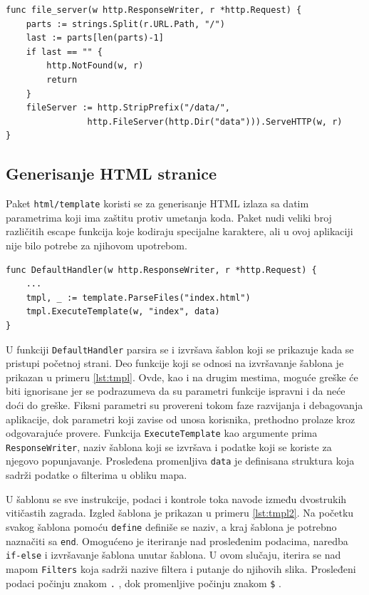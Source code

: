 \documentclass[12pt,oneside]{memoir}
\begin{document}
\begin{center}
\begin{lstlisting}[caption=Funkcija za rukovanje sa sistemom datoteka,label={lst:fileserver},  backgroundcolor=\color{background}]
func file_server(w http.ResponseWriter, r *http.Request) {
	parts := strings.Split(r.URL.Path, "/")
	last := parts[len(parts)-1]
	if last == "" {
		http.NotFound(w, r)
		return
	}
	fileServer := http.StripPrefix("/data/", 
				http.FileServer(http.Dir("data"))).ServeHTTP(w, r)
}
\end{lstlisting}
\end{center}

\subsection{Generisanje HTML stranice}

Paket \texttt{html/template} koristi se za generisanje HTML izlaza sa datim parametrima koji ima zaštitu protiv umetanja koda. Paket nudi veliki broj različitih escape funkcija koje kodiraju specijalne karaktere, ali u ovoj aplikaciji nije bilo potrebe za njihovom upotrebom. 

\begin{center}
\begin{lstlisting}[caption=Izvršavanje HTML šablona,label={lst:tmpl},  backgroundcolor=\color{background}]
func DefaultHandler(w http.ResponseWriter, r *http.Request) {
	...
	tmpl, _ := template.ParseFiles("index.html")
	tmpl.ExecuteTemplate(w, "index", data)
}
\end{lstlisting}
\end{center}

U funkciji \texttt{DefaultHandler} parsira se i izvršava šablon koji se prikazuje kada se pristupi početnoj strani. Deo funkcije koji se odnosi na izvršavanje šablona je prikazan u primeru \ref{lst:tmpl}. Ovde, kao i na drugim mestima, moguće greške će biti ignorisane jer se podrazumeva da su parametri funkcije ispravni i da neće doći do greške. Fiksni parametri su provereni tokom faze razvijanja i debagovanja aplikacije, dok parametri koji zavise od unosa korisnika, prethodno prolaze kroz odgovarajuće provere. Funkcija \texttt{ExecuteTemplate} kao argumente prima \texttt{ResponseWriter}, naziv šablona koji se izvršava i podatke koji se koriste za njegovo popunjavanje. Prosleđena promenljiva \texttt{data} je definisana struktura koja sadrži podatke o filterima u obliku mapa.

U šablonu se sve instrukcije, podaci i kontrole toka navode između dvostrukih vitičastih zagrada. Izgled šablona je prikazan u primeru \ref{lst:tmpl2}. Na početku svakog šablona pomoću \texttt{define} definiše se naziv, a kraj šablona je potrebno naznačiti sa \texttt{end}. Omogućeno je iteriranje nad prosleđenim podacima, naredba \texttt{if-else} i izvršavanje šablona unutar šablona. U ovom slučaju, iterira se nad mapom \texttt{Filters} koja sadrži nazive filtera i putanje do njihovih slika. Prosleđeni podaci počinju znakom \texttt{.} , dok promenljive počinju znakom \texttt{\$} \cite{template}.
\end{document}
